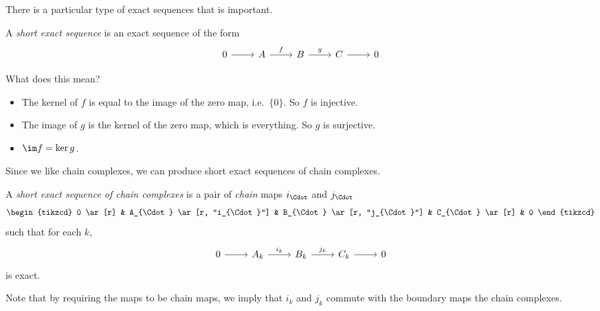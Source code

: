 \documentclass[a4paper]{article}
\begin{document}
There is a particular type of exact sequences that is important.

\begin{defi}
  A \emph{short exact sequence} is an exact sequence of the form
  \[
    \begin{tikzcd}
      0 \ar [r] & A \ar [r, "f"] & B \ar [r, "g"] & C \ar[r] & 0
    \end{tikzcd}
  \]
\end{defi}
What does this mean?
\begin{itemize}
  \item The kernel of $f$ is equal to the image of the zero map, i.e.\ $\{0\}$. So $f$ is injective.
  \item The image of $g$ is the kernel of the zero map, which is everything. So $g$ is surjective.
  \item $\im f = \ker g$.
\end{itemize}

Since we like chain complexes, we can produce short exact sequences of chain complexes.
\begin{defi}
  A \emph{short exact sequence of chain complexes} is a pair of \emph{chain} maps $i_{\Cdot}$ and $j_{\Cdot}$
  \[
    \begin{tikzcd}
      0 \ar[r] & A_{\Cdot} \ar [r, "i_{\Cdot}"] & B_{\Cdot} \ar [r, "j_{\Cdot}"] & C_{\Cdot} \ar[r] & 0
    \end{tikzcd}
  \]
  such that for each $k$,
  \[
    \begin{tikzcd}
      0 \ar[r] & A_k \ar [r, "i_k"] & B_k \ar [r, "j_k"] & C_k \ar[r] & 0
    \end{tikzcd}
  \]
  is exact.
\end{defi}
Note that by requiring the maps to be chain maps, we imply that $i_k$ and $j_k$ commute with the boundary maps the chain complexes.
\end{document}
